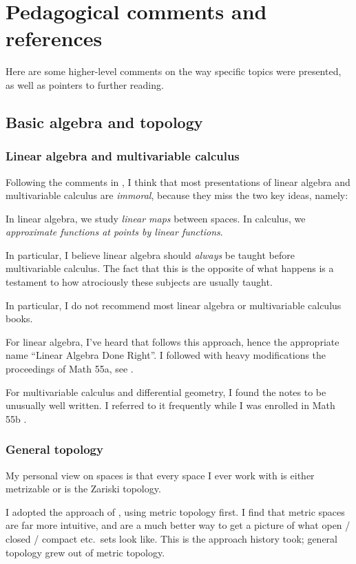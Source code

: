 \chapter{Pedagogical comments and references}
\label{ch:refs}
Here are some higher-level comments on the way specific topics were presented,
as well as pointers to further reading.

\section{Basic algebra and topology}
\subsection{Linear algebra and multivariable calculus}
Following the comments in ,
I think that most presentations of linear algebra and multivariable calculus
are \emph{immoral}, because they miss the two key ideas, namely:
\begin{itemize}
	\ii In linear algebra, we study \emph{linear maps} between spaces.
	\ii In calculus, we \emph{approximate functions at points by linear functions}.
\end{itemize}
In particular, I believe linear algebra should \emph{always} be taught
before multivariable calculus.
The fact that this is the opposite of what happens is a testament to how
atrociously these subjects are usually taught.

In particular, I do not recommend most linear algebra or
multivariable calculus books.

For linear algebra, I've heard that \cite{ref:axler} follows this approach,
hence the appropriate name ``Linear Algebra Done Right''.
I followed with heavy modifications the proceedings of Math 55a,
see \cite{ref:55a}.

For multivariable calculus and differential geometry,
I found the notes \cite{ref:manifolds} to be unusually well written.
I referred to it frequently while I was enrolled in Math 55b \cite{ref:55b}.

\subsection{General topology}
My personal view on spaces is that every space I ever work with
is either metrizable or is the Zariski topology.

I adopted the approach of \cite{ref:pugh}, using metric topology first.
I find that metric spaces are far more intuitive, and are a much better
way to get a picture of what open / closed / compact etc.\ sets look like.
This is the approach history took; general topology grew out of metric topology.

